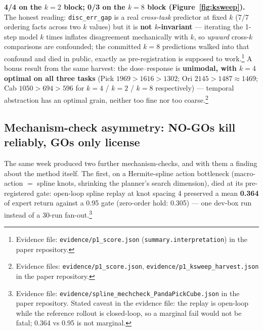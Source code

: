 \documentclass{article}
\begin{document}
\textbf{4/4 on the $k{=}2$ block; 0/3 on the $k{=}8$ block (Figure~\ref{fig:ksweep}).} The honest reading: \texttt{disc\_err\_gap} is a real \emph{cross-task} predictor at fixed $k$ (7/7 ordering facts across two $k$ values) but it is \textbf{not $k$-invariant} --- iterating the 1-step model $k$ times inflates disagreement mechanically with $k$, so \emph{upward} cross-$k$ comparisons are confounded; the committed $k{=}8$ predictions walked into that confound and died in public, exactly as pre-registration is supposed to work.\footnote{Evidence file: \texttt{evidence/p1\_score.json} (\texttt{summary.interpretation}) in the paper repository.} A bonus result from the same harvest: the dose--response is \textbf{unimodal, with $k{=}4$ optimal on all three tasks} (Pick $1969 > 1616 > 1302$; Ori $2145 > 1487 \approx 1469$; Cab $1050 > 694 > 596$ for $k{=}4$ / $k{=}2$ / $k{=}8$ respectively) --- temporal abstraction has an optimal grain, neither too fine nor too coarse.\footnote{Evidence files: \texttt{evidence/p1\_score.json}, \texttt{evidence/p1\_ksweep\_harvest.json} in the paper repository.}

\subsection{Mechanism-check asymmetry: NO-GOs kill reliably, GOs only license}
\label{sec:goasym}

The same week produced two further mechanism-checks, and with them a finding about the method itself. The first, on a Hermite-spline action bottleneck (macro-action $=$ spline knots, shrinking the planner's search dimension), died at its pre-registered gate: open-loop spline replay at knot spacing 4 preserved a mean \textbf{0.364} of expert return against a 0.95 gate (zero-order hold: 0.305) --- one dev-box run instead of a 30-run fan-out.\footnote{Evidence file: \texttt{evidence/spline\_mechcheck\_PandaPickCube.json} in the paper repository. Stated caveat in the evidence file: the replay is open-loop while the reference rollout is closed-loop, so a marginal fail would not be fatal; 0.364 vs 0.95 is not marginal.}
\end{document}
